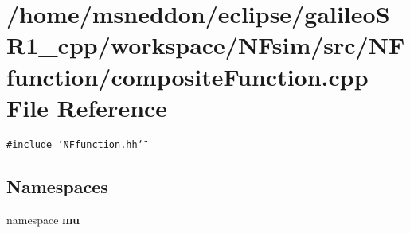 \section{/home/msneddon/eclipse/galileoSR1\_\-cpp/workspace/NFsim/src/NFfunction/compositeFunction.cpp File Reference}
\label{compositeFunction_8cpp}


{\tt \#include \char`\"{}NFfunction.hh\char`\"{}}\par
\subsection*{Namespaces}
\begin{CompactItemize}
\item 
namespace {\bf mu}
\end{CompactItemize}
